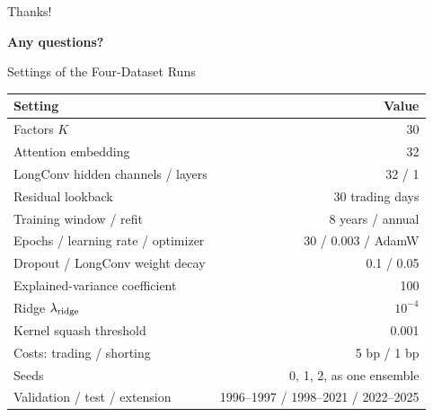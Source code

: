 \documentclass[11pt]{beamer}
\newcommand{\claim}[1]{%
  \par{\color{SBred}\bfseries #1\par}
}
\begin{document}

\begin{frame}{Thanks!}
\claim{Any questions?}
\end{frame}


\begin{frame}{Settings of the Four-Dataset Runs}
\small
\begin{tabular}{@{}lr@{}}\toprule
Setting & Value\\\midrule
Factors $K$ & 30\\
Attention embedding & 32\\
LongConv hidden channels / layers & 32 / 1\\
Residual lookback & 30 trading days\\
Training window / refit & 8 years / annual\\
Epochs / learning rate / optimizer & 30 / 0.003 / AdamW\\
Dropout / LongConv weight decay & 0.1 / 0.05\\
Explained-variance coefficient & 100\\
Ridge $\lambda_{\rm ridge}$ & $10^{-4}$\\
Kernel squash threshold & 0.001\\
Costs: trading / shorting & 5 bp / 1 bp\\
Seeds & 0, 1, 2, as one ensemble\\
Validation / test / extension & 1996--1997 / 1998--2021 / 2022--2025\\\bottomrule
\end{tabular}\par
\end{frame}

\newcommand{\ch}[1]{\texttt{#1}}            %
\newcommand{\cz}[1]{\mathrm{#1}^{*}}        %
\end{document}
